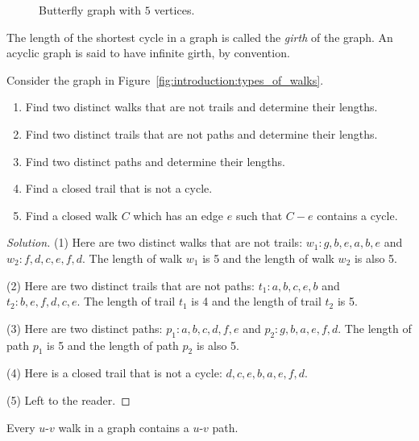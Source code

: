 \begin{figure}[!htbp]
\centering

\caption{Butterfly graph with $5$ vertices.}
\label{fig:introduction:butterfly_graph}
\end{figure}

The length of the shortest cycle in a graph is called the \emph{girth}
of the graph. An acyclic graph is said to have infinite girth, by
convention.

\begin{example}
\label{eg:introduction:walks_paths_trails}
Consider the graph in Figure~\ref{fig:introduction:types_of_walks}.
%
\begin{enumerate}
\item Find two distinct walks that are not trails and determine their
  lengths.

\item Find two distinct trails that are not paths and determine their
  lengths.

\item Find two distinct paths and determine their lengths.

\item Find a closed trail that is not a cycle.

\item Find a closed walk $C$ which has an edge $e$ such that $C - e$
  contains a cycle.
\end{enumerate}
\end{example}

\begin{proof}[Solution]
(1) Here are two distinct walks that are not trails:
$w_1: g, b, e, a, b, e$ and $w_2: f, d, c, e, f, d$. The length of
walk $w_1$ is 5 and the length of walk $w_2$ is also 5.

(2) Here are two distinct trails that are not paths:
$t_1: a,b,c,e,b$ and $t_2: b,e,f,d,c,e$. The length of trail $t_1$ is
4 and the length of trail $t_2$ is 5.

(3) Here are two distinct paths: $p_1: a, b, c, d, f, e$ and
$p_2: g, b, a, e, f, d$. The length of path $p_1$ is 5 and the length
of path $p_2$ is also 5.

(4) Here is a closed trail that is not a cycle: $d, c, e, b, a, e, f, d$.

(5) Left to the reader.
\end{proof}

\begin{theorem}
\label{thm:introduction:every_walk_has_a_path}
Every $u$-$v$ walk in a graph contains a $u$-$v$ path.
\end{theorem}

